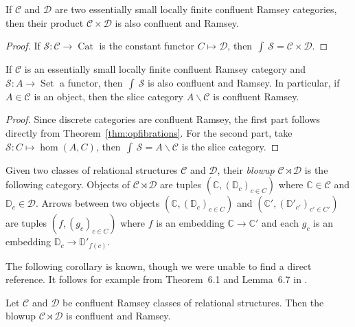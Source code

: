 \documentclass[preprint,12pt]{elsarticle}
\newcommand{\cat}[1]{\mathcal{#1}}
\newcommand{\str}[1]{\mathbb{#1}}
\DeclareMathOperator{\Set}{Set}
\DeclareMathOperator{\Cat}{Cat}
\DeclareMathOperator{\Elts}{\int\!}
\begin{document}
\begin{cor}
\label{cor:prod}
    If $\cat C$ and $\cat D$ are two essentially small locally finite confluent Ramsey categories, then their product $\cat C\times\cat D$ is also confluent and Ramsey.
\end{cor}


\begin{proof}
    If $\cat S:\cat C\to\Cat$ is the constant functor $C\mapsto \cat D$, then $\Elts \cat S=\cat C\times \cat D$.
\end{proof}

\begin{cor}
\label{cor:slice }
    If $\cat C$ is an essentially small locally finite confluent Ramsey category and $\cat S:A\to\Set$ a functor, then $\Elts \cat S$ is also confluent and Ramsey. In particular, if $A\in\cat C$ is an object, then the slice category $A\backslash\cat C$ is confluent Ramsey.
\end{cor}
\begin{proof} 
Since discrete categories are confluent Ramsey, the first part follows directly from Theorem~\ref{thm:opfibrations}. For the second part, take $\cat S:C\mapsto\hom(A,C)$, then $\Elts\cat S=A\backslash\cat C$ is the slice category.
\end{proof}


\begin{defin}
    Given two classes of relational structures $\cat C$ and $\cat D$, their \emph{blowup} $\cat C\rtimes\cat D$ is the following category. Objects of $\cat C\rtimes\cat D$ are tuples $(\str C,(\str D_c)_{c\in C})$ where $\str C\in\cat C$ and $\str D_c\in\cat D$. Arrows between two objects $(\str C,(\str D_c)_{c\in C})$ and $(\str C',({\str D'}_{c'})_{c'\in C'})$ are tuples $(f, (g_c)_{c\in C})$ where $f$ is an embedding $\str C\to\str C'$ and each $g_c$ is an embedding $\str D_c\to \str D'_{f(c)}$.
\end{defin}

The following corollary is known, though we were unable to find a direct reference. It follows for example from Theorem~6.1 and Lemma~6.7 in \cite{KPT2005}.

\begin{cor}
    Let $\cat C$ and $\cat D$ be confluent Ramsey classes of relational structures. Then the blowup $\cat C\rtimes \cat D$ is confluent and Ramsey.
\end{cor}
\end{document}
